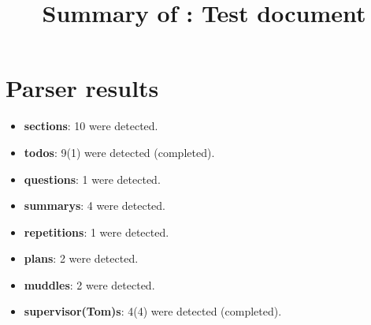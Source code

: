 \title{Summary of : Test document}
\maketitle

\section{Parser results}
    \begin{itemize}[noitemsep]
\item \textbf{sections}: 10 were detected.
\item \textbf{todos}: 9(1) were detected (completed).
\item \textbf{questions}: 1 were detected.
\item \textbf{summarys}: 4 were detected.
\item \textbf{repetitions}: 1 were detected.
\item \textbf{plans}: 2 were detected.
\item \textbf{muddles}: 2 were detected.
\item \textbf{supervisor(Tom)s}: 4(4) were detected (completed).
    \end{itemize}

